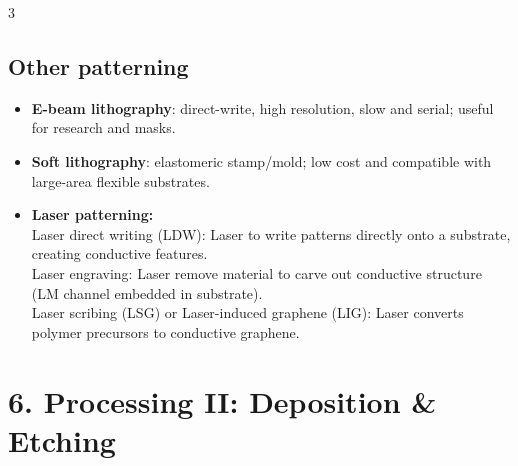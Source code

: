 \documentclass[10pt,a4paper]{ctexart}
\newcommand{\key}[1]{\textbf{#1}}
\begin{document}
\begin{multicols*}{3}
\subsection{Other patterning}
\begin{itemize}
  \item \key{E-beam lithography}: direct-write, high resolution, slow and serial; useful for research and masks.
  \item \key{Soft lithography}: elastomeric stamp/mold; low cost and compatible with large-area flexible substrates.
  \item \key{Laser patterning:}\\
  Laser direct writing (LDW): Laser to write patterns directly onto a substrate, creating conductive features.\\
  Laser engraving: Laser remove material to carve out conductive structure (LM channel embedded in substrate).\\
  Laser scribing (LSG) or Laser-induced graphene (LIG): Laser converts polymer precursors to conductive graphene.
\end{itemize}


\section{6. Processing II: Deposition \& Etching}

\end{multicols*}
\end{document}
